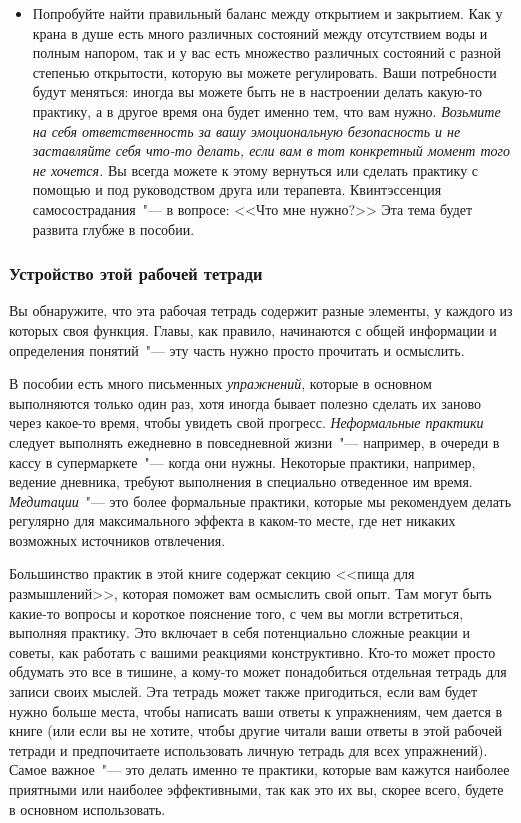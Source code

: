 \begin{itemize}
		\item Попробуйте найти правильный баланс между открытием и закрытием. Как у крана в душе есть много различных состояний между отсутствием воды и полным напором, так и у вас есть множество различных состояний с разной степенью открытости, которую вы можете регулировать. Ваши потребности будут меняться: иногда вы можете быть не в настроении делать какую-то практику, а в другое время она будет именно тем, что вам нужно. \emph{Возьмите на себя ответственность за вашу эмоциональную безопасность и не заставляйте себя что-то делать, если вам в тот конкретный момент того не хочется.} Вы всегда можете к этому вернуться или сделать практику с помощью и под руководством друга или терапевта. Квинтэссенция самосострадания~"--- в вопросе: <<Что мне нужно?>> Эта тема будет развита глубже в пособии. 
	\end{itemize}
	
	
	\subsubsection*{Устройство этой рабочей тетради}
	
	Вы обнаружите, что эта рабочая тетрадь содержит разные элементы, у каждого из которых своя функция. Главы, как правило, начинаются с общей информации и определения понятий~"--- эту часть нужно просто прочитать и осмыслить. 
	
	В пособии есть много письменных \emph{упражнений}, которые в основном выполняются только один раз, хотя иногда бывает полезно сделать их заново через какое-то время, чтобы увидеть свой прогресс. \emph{Неформальные практики} следует выполнять ежедневно в повседневной жизни~"--- например, в очереди в кассу в супермаркете~"--- когда они нужны. Некоторые практики, например, ведение дневника, требуют выполнения в специально отведенное им время. \emph{Медитации}~"--- это более формальные практики, которые мы рекомендуем делать регулярно для максимального эффекта в каком-то месте, где нет никаких возможных источников отвлечения. 
	
	Большинство практик в этой книге содержат секцию <<пища для размышлений>>, которая поможет вам осмыслить свой опыт. Там могут быть какие-то вопросы и короткое пояснение того,  с чем вы могли встретиться, выполняя практику.  Это включает в себя потенциально сложные реакции и советы, как работать с вашими реакциями конструктивно. Кто-то может просто обдумать это все в тишине, а кому-то может понадобиться отдельная тетрадь для записи своих мыслей. Эта тетрадь может также пригодиться, если вам будет нужно больше места, чтобы написать ваши ответы к упражнениям, чем дается в книге (или если вы не хотите, чтобы другие читали ваши ответы в этой рабочей тетради и предпочитаете использовать личную тетрадь для всех упражнений). Самое важное~"--- это делать именно те практики, которые вам кажутся наиболее приятными или наиболее эффективными, так как это их вы, скорее всего, будете в основном использовать. 
	
